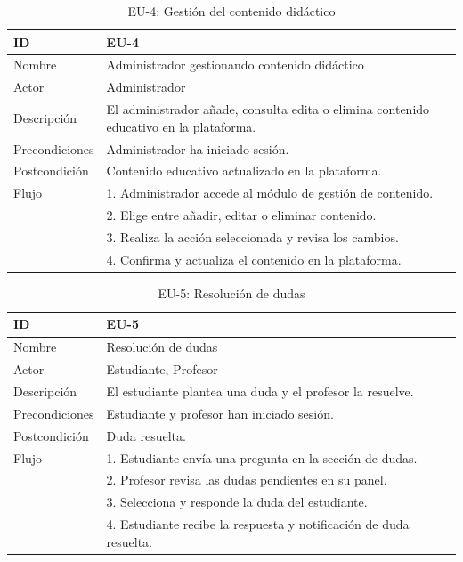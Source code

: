 \begin{table}[H]
    \centering
    \begin{tabularx}{\textwidth}{|l|X|}
    \hline
    ID & EU-4 \\
    \hline
    Nombre & Administrador gestionando contenido didáctico \\
    \hline
    Actor & Administrador \\
    \hline
    Descripción & El administrador añade, consulta edita o elimina contenido educativo en la plataforma. \\
    \hline
    Precondiciones & Administrador ha iniciado sesión. \\
    \hline
    Postcondición & Contenido educativo actualizado en la plataforma. \\
    \hline
    Flujo & 
    1. Administrador accede al módulo de gestión de contenido. \\
    & 2. Elige entre añadir, editar o eliminar contenido. \\
    & 3. Realiza la acción seleccionada y revisa los cambios. \\
    & 4. Confirma y actualiza el contenido en la plataforma. \\
    \hline
    \end{tabularx}
    \caption{EU-4: Gestión del contenido didáctico}
\end{table}

\begin{table}[H]
    \centering
    \begin{tabularx}{\textwidth}{|l|X|}
    \hline
    ID & EU-5 \\
    \hline
    Nombre & Resolución de dudas \\
    \hline
    Actor & Estudiante, Profesor \\
    \hline
    Descripción & El estudiante plantea una duda y el profesor la resuelve. \\
    \hline
    Precondiciones & Estudiante y profesor han iniciado sesión. \\
    \hline
    Postcondición & Duda resuelta. \\
    \hline
    Flujo & 
    1. Estudiante envía una pregunta en la sección de dudas. \\
    & 2. Profesor revisa las dudas pendientes en su panel. \\
    & 3. Selecciona y responde la duda del estudiante. \\
    & 4. Estudiante recibe la respuesta y notificación de duda resuelta. \\
    \hline
    \end{tabularx}
    \caption{EU-5: Resolución de dudas}
\end{table}

